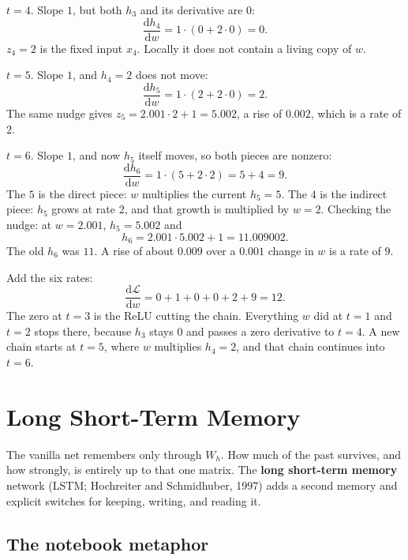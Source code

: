 \documentclass[11pt]{article}
\begin{document}
\(t=4\). Slope \(1\), but both \(h_3\) and its derivative are \(0\):
\[
\frac{\mathrm{d}h_4}{\mathrm{d}w}
=
1\cdot(0+2\cdot 0)=0.
\]
\(z_4=2\) is the fixed input \(x_4\). Locally it does not contain a living
copy of \(w\).

\(t=5\). Slope \(1\), and \(h_4=2\) does not move:
\[
\frac{\mathrm{d}h_5}{\mathrm{d}w}
=
1\cdot(2+2\cdot 0)=2.
\]
The same nudge gives \(z_5=2.001\cdot 2+1=5.002\), a rise of \(0.002\),
which is a rate of \(2\).

\(t=6\). Slope \(1\), and now \(h_5\) itself moves, so both pieces are
nonzero:
\[
\frac{\mathrm{d}h_6}{\mathrm{d}w}
=
1\cdot(5+2\cdot 2)=5+4=9.
\]
The \(5\) is the direct piece: \(w\) multiplies the current \(h_5=5\). The
\(4\) is the indirect piece: \(h_5\) grows at rate \(2\), and that growth is
multiplied by \(w=2\). Checking the nudge: at \(w=2.001\),
\(h_5=5.002\) and
\[
h_6=2.001\cdot 5.002+1=11.009002.
\]
The old \(h_6\) was \(11\). A rise of about \(0.009\) over a \(0.001\)
change in \(w\) is a rate of \(9\).

Add the six rates:
\[
\frac{\mathrm{d}\mathcal{L}}{\mathrm{d}w}
=
0+1+0+0+2+9
=
12.
\]
The zero at \(t=3\) is the ReLU cutting the chain. Everything \(w\) did at
\(t=1\) and \(t=2\) stops there, because \(h_3\) stays \(0\) and passes a
zero derivative to \(t=4\). A new chain starts at \(t=5\), where \(w\)
multiplies \(h_4=2\), and that chain continues into \(t=6\).

\section{Long Short-Term Memory}
\label{sec:lstm}

The vanilla net remembers only through \(W_h\). How much of the past
survives, and how strongly, is entirely up to that one matrix. The
\textbf{long short-term memory} network (LSTM; Hochreiter and Schmidhuber,
1997) adds a second memory and explicit switches for keeping, writing, and
reading it.

\subsection{The notebook metaphor}
\end{document}
